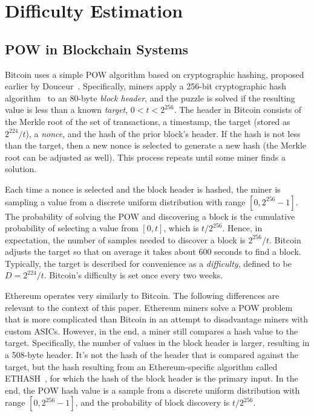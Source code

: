 \chapter{Difficulty Estimation}
\label{difficulty-estimation}

\section{POW in Blockchain Systems}
Bitcoin uses a simple POW algorithm based on cryptographic
hashing, proposed earlier by Douceur~\cite{Douceur:2002}.
Specifically, miners apply a 256-bit cryptographic hash algorithm~\cite{hashcash} to
an 80-byte {\em block header}, and the puzzle is solved if the
resulting value is less than a known {\em target}, $0<t<2^{256}$. The
header in Bitcoin consists of the Merkle root of the set of
transactions, a timestamp, the target (stored as $2^{224}/t$), a {\em
  nonce}, and the hash of the prior block's header. If the hash is not
less than the target, then a new nonce is selected to generate a new
hash (the Merkle root can be adjusted as well). This process repeats
until some miner finds a solution.
  
Each time a nonce is selected and the block
header is hashed, the miner is sampling a value from a discrete uniform
distribution with range $[0,2^{256}-1]$. The probability of solving the POW and
discovering a block is the cumulative probability of selecting a value
from $[0,t]$, which is $t/{2^{256}}$. Hence, in expectation, the
number of samples needed to discover a block is ${2^{256}/t}$. Bitcoin
adjusts the target so that on average it takes about 600 seconds to
find a block. Typically, the target is described for convenience as a
{\em difficulty}, defined to be $D=2^{224}/t$. Bitcoin's difficulty
is set once every two weeks.

 Ethereum operates very similarly to Bitcoin. The
following differences are relevant to the context of this paper.
Ethereum miners solve a POW problem that is more complicated
than Bitcoin in an attempt to disadvantage miners with custom ASICs.
However, in the end, a miner still compares a hash value to the target.
Specifically, the number of values in the block header is larger,
resulting in a 508-byte header. It's not the hash of the header that
is compared against the target, but the hash resulting from an
Ethereum-specific algorithm called ETHASH~\cite{ETHASH}, for which the
hash of the block header is the primary input. In the end, the POW
hash value is a sample from a discrete uniform distribution with range
$[0,2^{256}-1]$, and the probability of block discovery is
${t/2^{256}}$.

